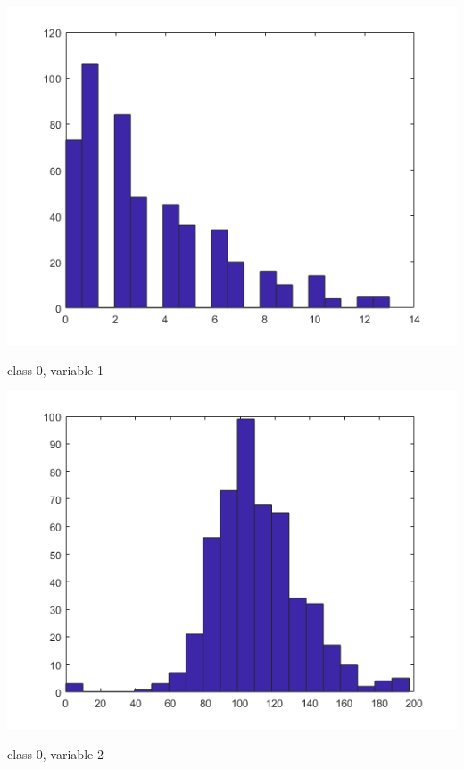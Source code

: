 \documentclass[a4paper]{article}
\begin{document}
\begin{center}
    \includegraphics[scale=1]{0-1.png}
    \caption{class 0, variable 1}
\end{center}

\begin{center}
    \includegraphics[scale=1]{0-2.png}
    \caption{class 0, variable 2}
\end{center}
\end{document}
